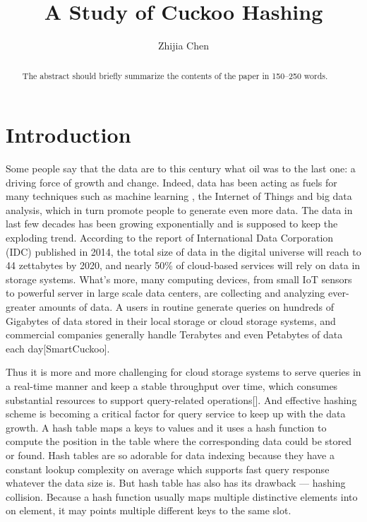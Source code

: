 \documentclass[runningheads]{llncs}
\begin{document}
%
\title{A Study of Cuckoo Hashing}
%
%
\author{Zhijia Chen}

\maketitle              %
%
\begin{abstract}
The abstract should briefly summarize the contents of the paper in
150--250 words.

\end{abstract}
%
%
%
\section{Introduction}
Some people say that the data are to this century what oil was to the last one: a driving force of growth and change. Indeed, data has been acting as fuels for many techniques such as machine learning , the Internet of Things and big data analysis, which in turn promote people to generate even more data. The data in last few decades has been growing exponentially and is supposed to keep the exploding trend. According to the report of International Data Corporation (IDC) published in 2014, the total size of data in the digital universe will reach to 44 zettabytes by 2020, and nearly 50\% of cloud-based services will rely on data in storage systems. What's more, many computing devices, from small IoT sensors to powerful server in large scale data centers, are collecting and analyzing ever-greater amounts of data. A users in routine generate queries on hundreds of Gigabytes of data stored in their local storage or cloud storage systems, and commercial companies generally handle Terabytes and even Petabytes of data each day[SmartCuckoo].

Thus it is more and more challenging for cloud storage systems to serve queries in a real-time manner and keep a stable throughput over time, which consumes substantial resources to support query-related operations[]. And effective hashing scheme is becoming a critical factor for query service to keep up with the data growth. A hash table maps a keys to values and it uses a hash function to compute the position in the table where the corresponding data could be stored or found. Hash tables are so adorable for data indexing because they have a constant lookup complexity on average which supports fast query response whatever the data size is. But hash table has also has its drawback --- hashing collision. Because a hash function usually maps multiple distinctive elements into on element, it may points multiple different keys to the same slot.
\end{document}
